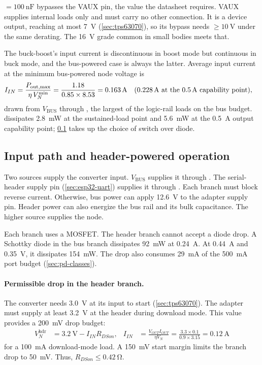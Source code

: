  $= \SI{100}{\nano\farad}$ bypasses the VAUX pin, the value the
datasheet requires. VAUX supplies internal loads only and must carry no other
connection. It is a device output, reaching at most \SI{7}{\volt}
(\cref{sec:tps63070}), so its bypass needs $\geq\SI{10}{\volt}$ under the same
derating. The \SI{16}{\volt} grade common in small bodies meets that.

The buck-boost's input current is discontinuous in boost mode but continuous in
buck mode, and the bus-powered case is always the latter. Average input current
at the minimum bus-powered node voltage is
\begin{align*}
  I_{IN} &= \frac{P_{\mathrm{out,max}}}{\eta\,V_N^{\min}}
    = \frac{1.18}{0.85 \times 8.53} = \SI{0.163}{\ampere}
  \quad (\SI{0.228}{\ampere}\ \text{at the \SI{0.5}{\ampere} capability point}),
\end{align*}
drawn from $V_{\mathrm{BUS}}$ through , the largest of the
logic-rail loads on the bus budget.  dissipates
\SI{2.8}{\milli\watt} at the sustained-load point and \SI{5.6}{\milli\watt} at
the \SI{0.5}{\ampere} output capability point;
\cref{sec:3v3-diodeor} takes up the choice of switch over diode.

\subsection{Input path and header-powered operation}\label{sec:3v3-diodeor}

Two sources supply the converter input. $V_{\mathrm{BUS}}$ supplies it through
. The serial-header supply pin (\cref{sec:esp32-uart}) supplies
it through . Each branch must block reverse current. Otherwise,
bus power can apply \SI{12.6}{\volt} to the adapter supply pin. Header power
can also energize the bus rail and its bulk capacitance. The higher source
supplies the node.

Each branch uses a MOSFET. The header branch cannot accept a diode drop. A
Schottky diode in the bus branch dissipates \SI{92}{\milli\watt} at
\SI{0.24}{\ampere}. At \SI{0.44}{\ampere} and \SI{0.35}{\volt}, it dissipates
\SI{154}{\milli\watt}. The drop also consumes \SI{29}{\milli\ampere} of the
\SI{500}{\milli\ampere} port budget (\cref{sec:pd-classes}).

\paragraph{Permissible drop in the header branch.} The converter needs
\SI{3.0}{\volt} at its input to start (\cref{sec:tps63070}). The adapter must
supply at least \SI{3.2}{\volt} at the header during download mode. This value
provides a \SI{200}{\milli\volt} drop budget:
\begin{align*}
  V_N^{\mathrm{hdr}} &= \SI{3.2}{\volt} - I_{IN}R_{DSon}, &
  I_{IN} &= \frac{V_{OUT}I_{OUT}}{\eta V_N}
    = \frac{3.3\times0.1}{0.9\times3.15} = \SI{0.12}{\ampere}
\end{align*}
for a \SI{100}{\milli\ampere} download-mode load. A
\SI{150}{\milli\volt} start margin limits the branch drop to
\SI{50}{\milli\volt}. Thus, $R_{DSon} \leq \SI{0.42}{\ohm}$.

